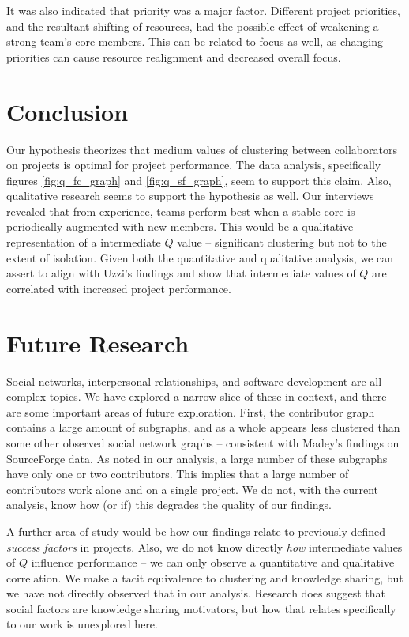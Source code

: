 \documentclass{proc}
\begin{document}
It was also indicated that priority was a major factor. Different project priorities, and the resultant shifting of resources, had the possible effect of weakening a strong team's core members. This can be related to focus as well, as changing priorities can cause resource realignment and decreased overall focus.

\section{Conclusion}
Our hypothesis theorizes that medium values of clustering between collaborators on projects is optimal for project performance. The data analysis, specifically figures \ref{fig:q_fc_graph} and \ref{fig:q_sf_graph}, seem to support this claim. Also, qualitative research seems to support the hypothesis as well. Our interviews revealed that from experience, teams perform best when a stable core is periodically augmented with new members. This would be a qualitative representation of a intermediate $Q$ value -- significant clustering but not to the extent of isolation. Given both the quantitative and qualitative analysis, we can assert to align with Uzzi's findings\cite{uzzi2005collaboration} and show that intermediate values of $Q$ are correlated with increased project performance.

\section{Future Research}
Social networks, interpersonal relationships, and software development are all complex topics. We have explored a narrow slice of these in context, and there are some important areas of future exploration. First, the contributor graph contains a large amount of subgraphs, and as a whole appears less clustered than some other observed social network graphs -- consistent with Madey's findings\cite{madey2002open} on SourceForge data. As noted in our analysis, a large number of these subgraphs have only one or two contributors. This implies that a large number of contributors work alone and on a single project. We do not, with the current analysis, know how (or if) this degrades the quality of our findings.

A further area of study would be how our findings relate to previously defined \textit{success factors} in projects\cite{cooke2002real}. Also, we do not know directly \textit{how} intermediate values of $Q$ influence performance -- we can only observe a quantitative and qualitative correlation. We make a tacit equivalence to clustering and knowledge sharing, but we have not directly observed that in our analysis. Research does suggest that social factors are knowledge sharing motivators\cite{hendriks1999share}, but how that relates specifically to our work is unexplored here.
\end{document}
